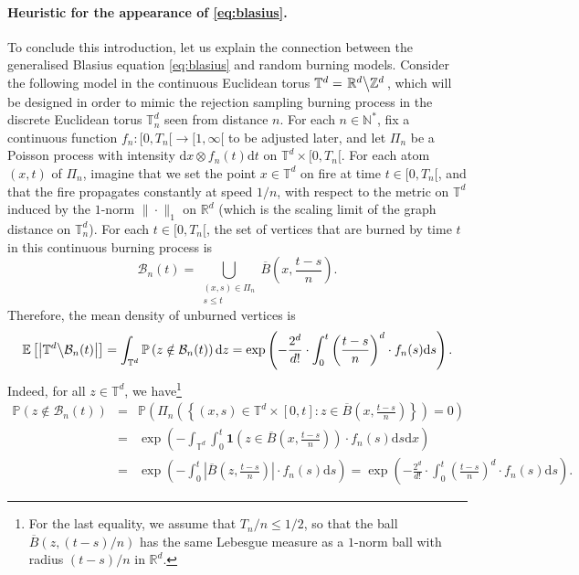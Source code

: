 \documentclass[a4paper,11pt]{article}
\begin{document}
\paragraph{Heuristic for the appearance of \eqref{eq:blasius}.}
To conclude this introduction, let us explain the connection between the generalised Blasius equation \eqref{eq:blasius} and random burning models.
Consider the following model in the continuous Euclidean torus $\mathbb{T}^d=\left.\mathbb{R}^d\middle\backslash\mathbb{Z}^d\right.$, which will be designed in order to mimic the rejection sampling burning process in the discrete Euclidean torus $\mathbb{T}_n^d$ seen from distance $n$.
For each $n\in\mathbb{N}^*$, fix a continuous function $f_n:{[0,T_n[}\rightarrow[1,\infty[$ to be adjusted later, and let $\Pi_n$ be a Poisson process with intensity $\mathrm{d}x\otimes f_n(t)\mathrm{d}t$ on $\mathbb{T}^d\times[0,T_n[$.
For each atom $(x,t)$ of $\Pi_n$, imagine that we set the point $x\in\mathbb{T}^d$ on fire at time $t\in[0,T_n[$, and that the fire propagates constantly at speed $1/n$, with respect to the metric on $\mathbb{T}^d$ induced by the $1$-norm $\|\cdot\|_1$ on $\mathbb{R}^d$ (which is the scaling limit of the graph distance on $\mathbb{T}_n^d$).
For each $t\in[0,T_n[$, the set of vertices that are burned by time $t$ in this continuous burning process is
\[\mathcal{B}_n(t)=\bigcup_{\substack{(x,s)\in\Pi_n\\s\leq t}}\overline{B}\left(x,\frac{t-s}{n}\right).\]
Therefore, the mean density of unburned vertices is
\[\mathbb{E}\left[\left|\mathbb{T}^d\middle\backslash\mathcal{B}_n(t)\right|\right]=\int_{\mathbb{T}^d}\mathbb{P}\left(z\notin\mathcal{B}_n(t)\right)\mathrm{d}z=\exp\left(-\frac{2^d}{d!}\cdot\int_0^t\left(\frac{t-s}{n}\right)^d\cdot f_n(s)\mathrm{d}s\right).\]
Indeed, for all $z\in\mathbb{T}^d$, we have\footnote{For the last equality, we assume that $T_n/n\leq1/2$, so that the ball $\overline{B}(z,(t-s)/n)$ has the same Lebesgue measure as a $1$-norm ball with radius $(t-s)/n$ in $\mathbb{R}^d$.}
\begin{eqnarray*}
\mathbb{P}\left(z\notin\mathcal{B}_n(t)\right)&=&\mathbb{P}\left(\Pi_n\left(\left\{(x,s)\in\mathbb{T}^d\times[0,t]:z\in\overline{B}\left(x,\frac{t-s}{n}\right)\right\}\right)=0\right)\\
&=&\exp\left(-\int_{\mathbb{T}^d}\int_0^t\mathbf{1}\left(z\in\overline{B}\left(x,\frac{t-s}{n}\right)\right)\cdot f_n(s)\mathrm{d}s\mathrm{d}x\right)\\
&=&\exp\left(-\int_0^t\left|\overline{B}\left(z,\frac{t-s}{n}\right)\right|\cdot f_n(s)\mathrm{d}s\right)=\exp\left(-\frac{2^d}{d!}\cdot\int_0^t\left(\frac{t-s}{n}\right)^d\cdot f_n(s)\mathrm{d}s\right).
\end{eqnarray*}
\end{document}

